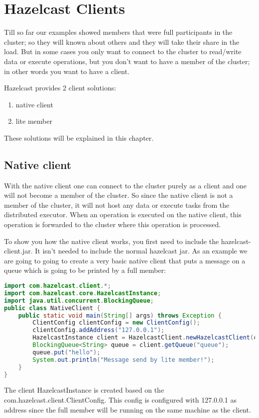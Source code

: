 \chapter{Hazelcast Clients}

Till so far our examples showed members that were full participants in the cluster; so they will known about others and they will take their share in the load. But in some cases you only want to connect to the cluster to read/write data or execute operations, but you don't want to have a member of the cluster; in other words you want to have a client.

Hazelcast provides 2 client solutions:
\begin{enumerate}
\item native client
\item lite member
\end{enumerate}
These solutions will be explained in this chapter. 
\section{Native client}
With the native client one can connect to the cluster purely as a client and one will not become a member of the cluster. So since the native client is not a member of the cluster, it will not host any data or execute tasks from the distributed executor. When an operation is executed on the native client, this operation is forwarded to the cluster where this operation is processed.

To show you how the native client works, you first need to include the hazelcast-client.jar. It isn't needed to include the normal hazelcast jar. As an example we are going to going to create a very basic native client that puts a message on a queue which is going to be printed by a full member:
\begin{lstlisting}[language=java]
import com.hazelcast.client.*;
import com.hazelcast.core.HazelcastInstance;
import java.util.concurrent.BlockingQueue;
public class NativeClient {
    public static void main(String[] args) throws Exception {
        ClientConfig clientConfig = new ClientConfig();
        clientConfig.addAddress("127.0.0.1");
        HazelcastInstance client = HazelcastClient.newHazelcastClient(clientConfig);
        BlockingQueue<String> queue = client.getQueue("queue");
        queue.put("hello");
        System.out.println("Message send by lite member!");
    }
}
\end{lstlisting}
The client HazelcastInstance is created based on the com.hazelcast.client.ClientConfig. This config is configured with 127.0.0.1 as address since the full member will be running on the same machine as the client.

